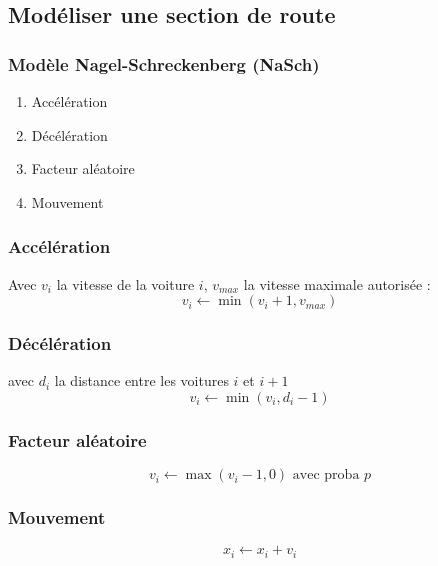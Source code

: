 \documentclass[slidetop,11pt]{beamer}
\begin{document}
\subsection{ Modéliser une section de route}
\begin{frame}
	\frametitle{Modèle Nagel-Schreckenberg (NaSch)}
	\begin{enumerate}
		\item Accélération 
		\item Décélération
		\item Facteur aléatoire
		\item Mouvement
	\end{enumerate}
\end{frame}

\begin{frame}
	\frametitle{Accélération}
	Avec $v_i$ la vitesse de la voiture $i$, $v_{max}$ la vitesse maximale autorisée : 
	\begin{equation}
		v_i \leftarrow \min (v_i+1,v_{max})
	\end{equation}
\end{frame}

\begin{frame}
	\frametitle{Décélération}
	avec $d_i$ la distance entre les voitures $i$ et $i+1$
	\begin{equation}
		v_i \leftarrow \min (v_i,d_i-1)
	\end{equation}
\end{frame}

\begin{frame}
	\frametitle{Facteur aléatoire}
	\begin{equation}
		v_i \leftarrow \max(v_i-1,0) \text{ avec proba } p
	\end{equation}
\end{frame}

\begin{frame}
	\frametitle{Mouvement}
	\begin{equation}
		x_i \leftarrow x_i + v_i
	\end{equation}
\end{frame}
\end{document}
